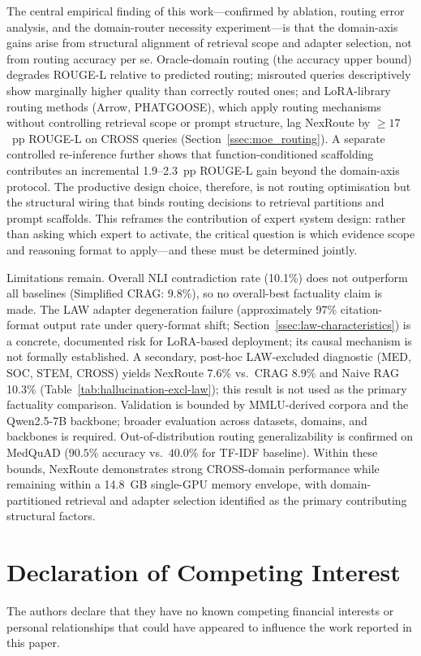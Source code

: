 \documentclass[a4paper,fleql,doubleblind]{cas-sc}
\begin{document}
The central empirical finding of this work---confirmed by ablation, routing error
analysis, and the domain-router necessity experiment---is that the domain-axis gains
arise from structural alignment of retrieval scope and adapter selection, not from
routing accuracy per se.
Oracle-domain routing (the accuracy upper bound) degrades ROUGE-L relative to
predicted routing; misrouted queries descriptively show marginally higher quality than
correctly routed ones; and LoRA-library routing methods (Arrow, PHATGOOSE), which
apply routing mechanisms without controlling retrieval scope or prompt structure,
lag NexRoute by ${\geq}17$~pp ROUGE-L on CROSS queries (Section~\ref{ssec:moe_routing}).
A separate controlled re-inference further shows that function-conditioned scaffolding
contributes an incremental 1.9--2.3~pp ROUGE-L gain beyond the domain-axis protocol.
The productive design choice, therefore, is not routing optimisation but the
structural wiring that binds routing decisions to retrieval partitions and prompt scaffolds.
This reframes the contribution of expert system design: rather than asking which
expert to activate, the critical question is which evidence scope and reasoning format
to apply---and these must be determined jointly.

Limitations remain.
Overall NLI contradiction rate (10.1\%) does not outperform all baselines
(Simplified CRAG: 9.8\%), so no overall-best factuality claim is made.
The LAW adapter degeneration failure (approximately 97\% citation-format output
rate under query-format shift; Section~\ref{ssec:law-characteristics}) is a
concrete, documented risk for LoRA-based deployment; its causal mechanism
is not formally established.
A secondary, post-hoc LAW-excluded diagnostic (MED, SOC, STEM, CROSS) yields
NexRoute 7.6\% vs.\ CRAG 8.9\% and Naive RAG 10.3\%
(Table~\ref{tab:hallucination-excl-law}); this result is not used as the
primary factuality comparison.
Validation is bounded by MMLU-derived corpora and the Qwen2.5-7B backbone;
broader evaluation across datasets, domains, and backbones is required.
Out-of-distribution routing generalizability is confirmed on MedQuAD ($90.5\%$
accuracy vs.\ $40.0\%$ for TF-IDF baseline).
Within these bounds, NexRoute demonstrates strong CROSS-domain performance while
remaining within a 14.8~GB single-GPU memory envelope, with domain-partitioned
retrieval and adapter selection identified as the primary contributing structural factors.

\section*{Declaration of Competing Interest}
The authors declare that they have no known competing financial interests or
personal relationships that could have appeared to influence the work reported
in this paper.
\end{document}

